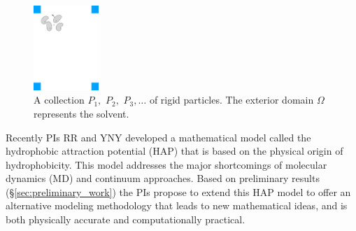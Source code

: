 \begin{figure}
\centerline{\includegraphics[width=0.22\textwidth]{figures/BG_fig1.pdf}}
\caption{ \footnotesize
A collection $P_1,$ $P_2,$ $P_3, \ldots$ of rigid particles.  The
  exterior domain $\Omega$ represents the solvent.}
  \label{fig:domain}
\end{figure}
Recently PIs RR and YNY developed a mathematical model called the
hydrophobic attraction potential (HAP) \cite{Fu2018_SIAM} that is based
on the physical origin of hydrophobicity.  This model addresses the
major shortcomings of molecular dynamics (MD) and continuum approaches.
Based on preliminary results (\S\ref{sec:preliminary_work}) the PIs
propose to extend this HAP model to offer an alternative modeling
methodology that leads to new mathematical ideas, and is both physically
accurate and computationally practical.
%
%
%
%
